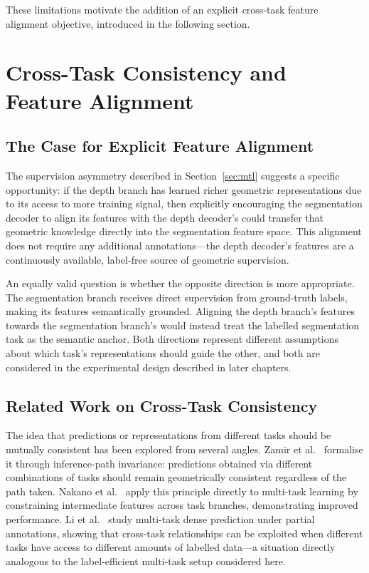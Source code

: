 These limitations motivate the addition of an explicit cross-task
feature alignment objective, introduced in the following section.

\section{Cross-Task Consistency and Feature Alignment}
\label{sec:cross-task}

\subsection{The Case for Explicit Feature Alignment}

The supervision asymmetry described in Section~\ref{sec:mtl} suggests a
specific opportunity: if the depth branch has learned richer geometric
representations due to its access to more training signal, then
explicitly encouraging the segmentation decoder to align its features
with the depth decoder's could transfer that geometric knowledge directly
into the segmentation feature space. This alignment does not require any
additional annotations---the depth decoder's features are a continuously
available, label-free source of geometric supervision.

An equally valid question is whether the opposite direction is more
appropriate. The segmentation branch receives direct supervision from
ground-truth labels, making its features semantically grounded. Aligning
the depth branch's features towards the segmentation branch's would
instead treat the labelled segmentation task as the semantic anchor.
Both directions represent different assumptions about which task's
representations should guide the other, and both are considered in the
experimental design described in later chapters.

\subsection{Related Work on Cross-Task Consistency}

The idea that predictions or representations from different tasks should
be mutually consistent has been explored from several angles.
Zamir et al.~\cite{zamir2020robust} formalise it through inference-path
invariance: predictions obtained via different combinations of tasks
should remain geometrically consistent regardless of the path taken.
Nakano et al.~\cite{nakano2021cross} apply this principle directly to
multi-task learning by constraining intermediate features across task
branches, demonstrating improved performance. Li et
al.~\cite{li2022learning} study multi-task dense prediction under partial
annotations, showing that cross-task relationships can be exploited when
different tasks have access to different amounts of labelled
data---a situation directly analogous to the label-efficient multi-task
setup considered here.

